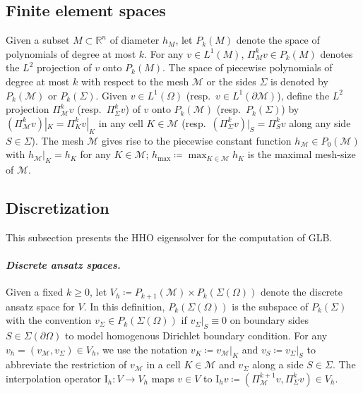 \documentclass[a4paper]{amsart}
\numberwithin{equation}{section}
\newcommand{\R}{\mathbb{R}}
\newcommand{\I}{\mathrm{I}}
\newcommand{\Mcal}{\mathcal{M}}
\theoremstyle{remark}
\theoremstyle{definition}
\theoremstyle{assumptionnoperiod}
\begin{document}
\subsection{Finite element spaces}\label{sec:fem-spaces}
Given a subset $M \subset \R^n$ of diameter $h_M$, let $P_k(M)$ denote the space of polynomials of degree at most $k$.
For any $v \in L^1(M)$, $\Pi_M^k v \in P_k(M)$ denotes the $L^2$ projection of $v$ onto $P_k(M)$. The space of piecewise polynomials of degree at most $k$ with respect to the mesh $\mathcal{M}$ or the sides $\Sigma$ is denoted by $P_k(\mathcal{M})$ or $P_k(\Sigma)$.
Given $v \in L^1(\Omega)$ (resp.~$v \in L^1(\partial \Mcal)$), define the $L^2$ projection $\Pi_{\mathcal{M}}^k v$ (resp.~$\Pi_\Sigma^k v$) of $v$ onto $P_k(\mathcal{M})$ (resp.~$P_k(\Sigma)$) by $(\Pi_{\mathcal{M}}^k v)|_K = \Pi_K^k v|_K$ in any cell $K \in \mathcal{M}$ (resp.~$(\Pi_\Sigma^k v)|_S = \Pi_S^k v$ along any side $S \in \Sigma$).
The mesh $\mathcal{M}$ gives rise to the piecewise constant function $h_\mathcal{M} \in P_0(\mathcal{M})$ with $h_\mathcal{M}|_K = h_K$ for any $K \in \Mcal$; $h_{\max} \coloneqq \max_{K \in \mathcal{M}} h_K$ is the maximal mesh-size of $\mathcal{M}$.

\subsection{Discretization}
This subsection presents the HHO eigensolver for the computation of GLB.\\[-0.5em]

\paragraph{\emph{Discrete ansatz spaces.}}
Given a fixed $k \geq 0$, let $V_h \coloneqq P_{k+1}(\mathcal{M}) \times P_k(\Sigma(\Omega))$ denote the discrete ansatz space for $V$.
In this definition, $P_k(\Sigma(\Omega))$ is the subspace of $P_k(\Sigma)$ with the convention $v_\Sigma \in P_k(\Sigma(\Omega))$ if $v_\Sigma|_S \equiv 0$ on boundary sides $S \in \Sigma(\partial \Omega)$ to model homogenous Dirichlet boundary condition.
For any $v_h = (v_\Mcal, v_\Sigma) \in V_h$, we use the notation $v_K \coloneqq v_\Mcal|_K$ and $v_S \coloneqq v_\Sigma|_S$ to abbreviate the restriction of $v_\Mcal$ in a cell $K \in \Mcal$ and $v_\Sigma$ along a side $S \in \Sigma$.
The interpolation operator $\I_h: V \to V_h$ maps $v \in V$ to $\I_h v \coloneqq (\Pi_\Mcal^{k+1} v, \Pi_\Sigma^k v) \in V_h$.\\[-0.5em]
\end{document}
